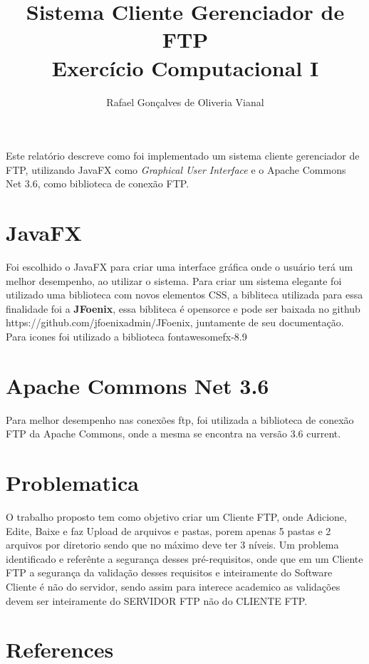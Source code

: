 \documentclass[12pt]{article}
\title{Sistema Cliente Gerenciador de FTP \\ Exercício Computacional I}
\author{Rafael Gonçalves de Oliveria Vianal\inst{1} }
\begin{document}
 

\maketitle

     
\begin{resumo} 
  Este relatório descreve como foi implementado um sistema cliente gerenciador de FTP, utilizando JavaFX como \textit{Graphical User Interface} e o Apache Commons Net 3.6, como biblioteca de conexão FTP.
\end{resumo}


\section{JavaFX}
Foi escolhido o JavaFX para criar uma interface gráfica onde o usuário terá um melhor desempenho, ao utilizar o sistema.
Para criar um sistema elegante foi utilizado uma biblioteca com novos elementos CSS, a bibliteca utilizada para essa finalidade foi  a \textbf{JFoenix}, essa bibliteca é opensorce e pode ser baixada no github https://github.com/jfoenixadmin/JFoenix, juntamente de seu documentação.
Para icones foi utilizado a biblioteca fontawesomefx-8.9 
	
\section{Apache Commons Net 3.6} \label{sec:firstpage}

Para melhor desempenho nas conexões ftp, foi utilizada a biblioteca de conexão FTP da Apache Commons, onde a mesma se encontra na versão 3.6 current.

\section{Problematica}
O trabalho proposto tem como objetivo criar um Cliente FTP, onde Adicione, Edite, Baixe e faz Upload de arquivos e pastas, porem apenas 5 pastas e 2 arquivos por diretorio sendo que no máximo deve ter 3 níveis.
Um problema identificado e referênte a segurança desses pré-requisitos, onde que em um Cliente FTP a segurança da validação desses requisitos e inteiramente do Software Cliente é não do servidor, sendo assim para interece academico as validações devem ser inteiramente do SERVIDOR FTP não do CLIENTE FTP.

\section{References}
\end{document}
